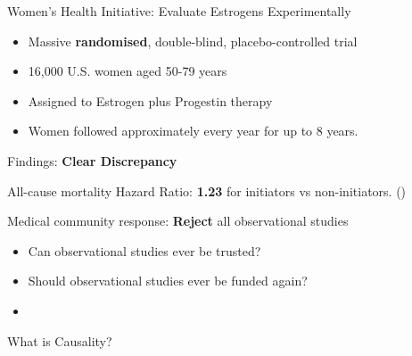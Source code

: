 \documentclass[
  ignorenonframetext,
  aspectratio=169,
  xcolor=\{dvipsnames\}]{beamer}
\begin{document}
\begin{frame}{Women's Health Initiative: Evaluate Estrogens
Experimentally}
\label{womens-health-initiative-evaluate-estrogens-experimentally}
\begin{itemize}
\item
  Massive \textbf{randomised}, double-blind, placebo-controlled trial
\item
  16,000 U.S. women aged 50-79 years
\item
  Assigned to Estrogen plus Progestin therapy
\item
  Women followed approximately every year for up to 8 years.
\end{itemize}
\end{frame}

\begin{frame}{Findings: \textbf{Clear Discrepancy}}
\label{findings-clear-discrepancy}
\begin{tcolorbox}[enhanced jigsaw, breakable, opacityback=0, opacitybacktitle=0.6, toprule=.15mm, colbacktitle=quarto-callout-warning-color!10!white, colframe=quarto-callout-warning-color-frame, bottomtitle=1mm, titlerule=0mm, colback=white, bottomrule=.15mm, arc=.35mm, leftrule=.75mm, coltitle=black, toptitle=1mm, title={Experimental Findings: \textbf{opposite of observational findings}}, rightrule=.15mm, left=2mm]

All-cause mortality Hazard Ratio: \textbf{1.23} for initiators vs
non-initiators. ()

\end{tcolorbox}
\end{frame}

\begin{frame}{Medical community response: \textbf{Reject} all
observational studies}
\label{medical-community-response-reject-all-observational-studies}
\begin{itemize}
\item
  Can observational studies ever be trusted?
\item
  Should observational studies ever be funded again?
\item
  \color{cyan}{What went wrong?}
\end{itemize}
\end{frame}

\begin{frame}{What is Causality?}
\label{what-is-causality}
\end{frame}
\end{document}
